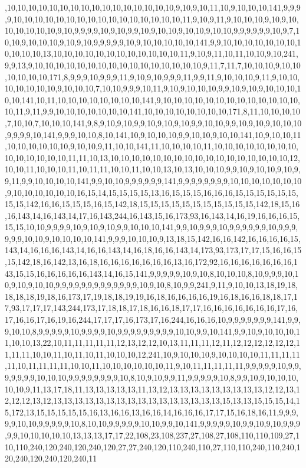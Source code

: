 ,10,10,10,10,10,10,10,10,10,10,10,10,10,10,10,10,9,10,9,10,11,10,9,10,10,10,141,9,9,9,9,10,10,10,10,10,10,10,10,10,10,10,10,10,10,10,10,11,9,10,9,11,9,10,10,10,9,10,9,10,10,10,10,10,10,9,10,9,9,9,9,10,9,10,9,9,10,9,10,10,9,10,10,9,10,10,9,9,9,9,9,9,10,9,7,10,10,9,10,10,10,9,10,9,10,9,9,9,9,9,10,9,10,10,10,10,10,141,9,9,10,10,10,10,10,10,10,10,10,10,10,13,10,10,10,10,10,10,10,10,10,10,10,10,11,9,10,9,11,10,11,10,10,9,10,241,9,9,13,9,10,10,10,10,10,10,10,10,10,10,10,10,10,10,10,10,9,11,7,11,7,10,10,10,9,10,10,10,10,10,10,171,8,9,9,9,10,9,9,9,11,9,10,9,10,9,9,9,11,9,9,11,9,10,10,10,9,11,9,10,10,10,10,10,10,10,9,10,10,10,7,10,10,9,9,9,10,11,9,10,9,10,10,10,9,9,10,9,10,9,10,10,10,10,10,141,10,11,10,10,10,10,10,10,10,10,141,9,10,10,10,10,10,10,10,10,10,10,10,10,10,10,11,9,11,9,9,10,10,10,10,10,10,10,141,10,10,10,10,10,10,10,10,171,8,11,10,10,10,10,7,10,10,7,10,10,10,141,9,8,9,10,9,10,9,9,10,9,10,9,10,9,9,10,10,9,9,10,9,10,9,10,10,10,9,9,9,9,10,141,9,9,9,10,10,8,10,141,10,9,10,10,10,9,9,10,10,9,10,10,141,10,9,10,10,11,10,10,10,10,10,10,9,10,10,9,11,10,10,141,11,10,10,10,10,11,10,10,10,10,10,10,10,10,10,10,10,10,10,10,11,11,10,13,10,10,10,10,10,10,10,10,10,10,10,10,10,10,10,10,10,12,10,10,11,10,10,10,11,10,11,11,10,10,11,10,10,13,10,13,10,10,10,9,9,10,9,10,10,9,10,9,9,11,9,9,10,10,10,10,141,9,9,10,10,9,9,9,9,9,9,141,9,9,9,9,9,9,9,9,10,10,10,10,10,10,10,9,10,10,10,10,10,10,16,15,14,15,15,15,15,13,16,15,15,15,16,16,16,15,15,15,15,15,15,15,15,142,16,16,15,15,15,16,15,142,18,15,15,15,15,15,15,15,15,15,15,15,142,18,15,16,16,143,14,16,143,14,17,16,143,244,16,143,15,16,173,93,16,143,14,16,19,16,16,16,15,15,15,10,10,9,9,9,9,10,9,10,9,10,9,9,10,10,10,141,9,9,10,9,9,9,10,9,9,9,9,9,9,10,9,9,9,9,9,9,10,10,9,10,10,10,10,141,9,9,9,10,10,10,9,13,18,15,142,16,16,142,16,16,16,16,15,143,14,16,16,16,143,14,16,16,143,14,16,18,16,16,143,14,173,93,173,17,17,15,16,16,15,15,142,18,16,142,13,16,18,16,16,16,16,16,16,16,13,16,172,92,16,16,16,16,16,16,16,143,15,15,16,16,16,16,16,143,14,16,15,141,9,9,9,9,9,10,9,10,8,10,10,10,8,10,9,9,9,10,10,9,10,9,10,10,9,9,9,9,9,9,9,9,9,9,9,9,9,10,9,10,8,10,9,9,241,9,11,9,10,10,13,18,19,18,18,18,18,19,18,16,173,17,19,18,18,19,19,16,18,16,16,16,16,19,16,18,16,16,18,18,17,17,93,17,17,17,143,244,173,17,18,18,17,18,16,16,18,17,17,16,16,16,16,16,16,16,17,16,17,16,16,17,16,19,16,244,17,17,17,16,173,17,16,244,16,16,16,10,9,9,9,9,9,9,9,141,9,9,9,10,10,8,9,9,9,9,9,10,9,9,9,9,10,9,9,9,9,9,9,9,9,9,10,10,9,9,10,141,9,9,10,9,10,10,10,11,10,10,13,22,10,11,11,11,11,11,12,13,12,12,10,13,11,11,11,12,11,12,12,12,12,12,12,11,11,11,10,10,11,10,11,10,11,10,10,10,12,241,10,9,10,10,10,9,10,10,10,10,11,11,11,11,11,10,11,11,11,11,10,10,11,10,10,10,10,10,10,11,9,10,11,11,11,11,11,9,9,9,9,9,10,9,9,9,9,9,9,9,10,10,10,9,9,9,9,9,9,9,9,10,8,10,9,10,9,9,11,9,9,9,9,9,10,8,9,9,10,9,10,10,10,10,10,9,11,13,17,18,11,13,13,13,13,13,11,13,12,13,13,13,13,13,13,13,13,13,12,12,13,12,12,12,13,12,13,13,13,13,13,13,13,13,13,13,13,13,13,13,13,13,15,13,13,15,15,15,14,15,172,13,15,15,15,15,15,16,13,16,16,13,16,16,14,16,16,16,17,17,15,16,18,16,11,9,9,9,9,9,10,10,9,9,9,9,9,10,8,10,10,9,9,9,9,9,10,10,9,9,10,141,9,9,9,9,9,10,9,9,10,9,10,9,9,9,9,9,10,10,10,10,10,13,13,13,17,17,22,108,23,108,237,27,108,27,108,110,110,109,27,110,110,240,120,240,120,240,120,27,27,240,120,110,240,110,27,110,110,240,110,240,120,240,120,240,120,240,11